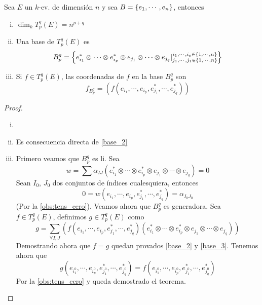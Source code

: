 \begin{thm}[(base de $T_p^q(E)$)]
	Sea $E$ un $k$-ev. de dimensión $n$ y sea $B = \{e_1, \cdots, e_n\}$,
	entonces
	\begin{enumerate}[i)]
		\item $\dim_k T_p^q(E) = n^{p+q}$
		\item \label{base_2} Una base de $T_p^q(E)$ es
		\[
		B_p^q = \left\{ e_{i_1}^* \otimes \cdots \otimes e_{i_p}^* \otimes
		e_{j_1} \otimes \cdots \otimes e_{j_q} \vert
		\substack{i_1, \cdots, i_p \in \{1,\cdots,n\} \\
			j_1, \cdots, j_1 \in \{1,\cdots,n\}} \right\}
		\]
		\item \label{base_3} Si $f \in T_p^q(E)$, las coordenadas de $f$ en la base $B_p^q$ son
		\[
		f_{B_p^q} = (f(e_{i_1}, \cdots, e_{i_p}, e_{j_1}^*, \cdots, e_{j_q}^*))
		\]
	\end{enumerate}
\end{thm}
\begin{proof}
	\begin{enumerate}[i)]
		\item[]
		\item Es consecuencia directa de \ref{base_2}
		\item Primero veamos que $B_p^q$ es li. Sea
		\[
		w = \sum \alpha_{IJ}(e_{i_1}^* \otimes \cdots \otimes e_{i_p}^*
		\otimes e_{j_1} \otimes \cdots \otimes e_{j_q}) = 0
		\]
		Sean $I_0$, $J_0$ dos conjuntos de índices cualesquiera, entonces
		\[
		0 = w(e_{i_1}, \cdots, e_{i_p}, e_{j_1}^*, \cdots, e_{j_q}^*)
		= \alpha_{I_0J_0}
		\]
		(Por la \cref{obs:tens_cero}). Veamos ahora que $B_p^q$
		es generadora. Sea $f \in T_p^q(E)$, definimos $g \in T_p^q(E)$ como
		\[
		g = \sum_{\forall I,J} (f(e_{i_1}, \cdots, e_{i_p}, e_{j_1}^*, \cdots,
		e_{j_q}^*)(e_{i_1}^* \otimes \cdots \otimes e_{i_p}^* \otimes e_{j_1}
		\otimes \cdots \otimes e_{j_q}))
		\]
		Demostrando ahora que $f=g$ quedan provados \ref{base_2} y \ref{base_3}.
		Tenemos ahora que
		\[
		g(e_{i_1^0}, \cdots, e_{i_p^0}, e_{j_1^0}^*, \cdots, e_{j_q^0}^*) =
		f(e_{i_1^0}, \cdots, e_{i_p^0}, e_{j_1^0}^*, \cdots, e_{j_q^0}^*)
		\]
		Por la \cref{obs:tens_cero} y queda demostrado el teorema.
	\end{enumerate}
\end{proof}
